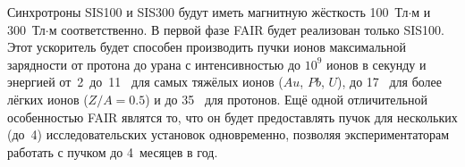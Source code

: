 Синхротроны SIS100 и SIS300 будут иметь магнитную жёсткость 100~Тл$\cdot$м и 300~Тл$\cdot$м соответственно. В первой фазе FAIR будет реализован только SIS100. Этот ускоритель будет способен производить пучки ионов максимальной зарядности от протона до урана с интенсивностью до $10^9$ ионов в секунду и энергией от~2~до~11~\GeVperNucl{} для самых тяжёлых ионов ($Au$, $Pb$, $U$), до 17~\GeVperNucl{} для более лёгких ионов ($Z/A=0.5$) и до 35~\GeV{} для протонов.
Ещё одной отличительной особенностью FAIR являтся то, что он будет предоставлять пучок для нескольких (до~4) исследовательских установок одновременно, позволяя экспериментаторам работать с пучком до 4~месяцев в год.





